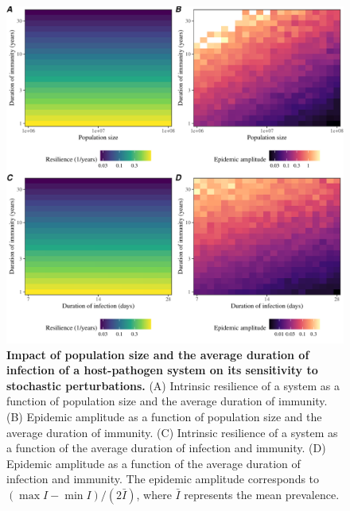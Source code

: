 \documentclass[12pt]{article}
\begin{document}
\pagebreak

\begin{figure}[!th]
\begin{center}
\includegraphics[width=\textwidth]{../figure6/figure_persistence_noise_popgamma.pdf}
\caption{
\textbf{Impact of population size and the average duration of infection of a host-pathogen system on its sensitivity to stochastic perturbations.}
(A) Intrinsic resilience of a system as a function of population size and the average duration of immunity.
(B) Epidemic amplitude as a function of population size and the average duration of immunity.
(C) Intrinsic resilience of a system as a function of the average duration of infection and immunity.
(D) Epidemic amplitude as a function of the average duration of infection and immunity.
The epidemic amplitude corresponds to $(\max I - \min I)/(2 \bar{I})$, where $\bar{I}$ represents the mean prevalence.
}
\end{center}
\end{figure}

\pagebreak
\end{document}
